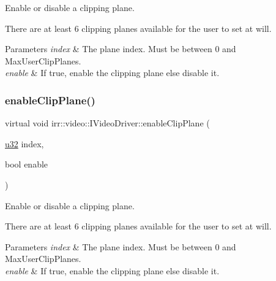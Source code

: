 Enable or disable a clipping plane. 

There are at least 6 clipping planes available for the user to set at will. 
\begin{DoxyParams}{Parameters}
{\em index} & The plane index. Must be between 0 and Max\+User\+Clip\+Planes. \\
\hline
{\em enable} & If true, enable the clipping plane else disable it. \\
\hline
\end{DoxyParams}
\mbox{\label{classirr_1_1video_1_1IVideoDriver_aaaf9567c759f866311c76e3874822339}} 
\subsubsection{\texorpdfstring{enable\+Clip\+Plane()}{enableClipPlane()}\hspace{0.1cm}{\footnotesize\ttfamily [2/2]}}
{\footnotesize\ttfamily virtual void irr\+::video\+::\+I\+Video\+Driver\+::enable\+Clip\+Plane (\begin{DoxyParamCaption}\item[{\hyperlink{namespaceirr_a0416a53257075833e7002efd0a18e804}{u32}}]{index,  }\item[{bool}]{enable }\end{DoxyParamCaption})\hspace{0.3cm}{\ttfamily [pure virtual]}}



Enable or disable a clipping plane. 

There are at least 6 clipping planes available for the user to set at will. 
\begin{DoxyParams}{Parameters}
{\em index} & The plane index. Must be between 0 and Max\+User\+Clip\+Planes. \\
\hline
{\em enable} & If true, enable the clipping plane else disable it. \\
\hline
\end{DoxyParams}
\mbox{\label{classirr_1_1video_1_1IVideoDriver_a7686a41fe0f506bb04c262f724f65756}} 
